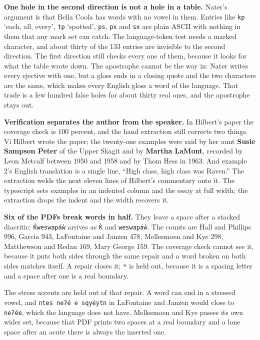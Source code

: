 \textbf{One hole in the second direction is not a hole in a table.} Nater's argument is that Bella Coola has words with no vowel in them. Entries like \texttt{kp} `each, all, every', \texttt{tp} `spotted', \texttt{ps}, \texttt{px} and \texttt{sx} are plain ASCII with nothing in them that any mark set can catch. The language-token test needs a marked character, and about thirty of the 133 entries are invisible to the second direction. The first direction still checks every one of them, because it looks for what the table wrote down. The apostrophe cannot be the way in: Nater writes every ejective with one, but a gloss ends in a closing quote and the two characters are the same, which makes every English gloss a word of the language. That trade is a few hundred false holes for about thirty real ones, and the apostrophe stays out.

\textbf{Verification separates the author from the speaker.} In Hilbert's paper \cite{src:Hilbert-1983} the coverage check is 100 percent, and the hand extraction still corrects two things. Vi Hilbert wrote the paper; the twenty-one examples were said by her aunt \textbf{Susie Sampson Peter} of the Upper Skagit and by \textbf{Martha LaMont}, recorded by Leon Metcalf between 1950 and 1958 and by Thom Hess in 1963. And example 2's English translation is a single line, ``High class, high class was Raven.'' The extraction welds the next eleven lines of Hilbert's commentary onto it. The typescript sets examples in an indented column and the essay at full width; the extraction drops the indent and the width recovers it.

\textbf{Six of the PDFs break words in half.} They leave a space after a stacked diacritic: \texttt{K̓weswapáw̓} arrives as \texttt{K̓} and \texttt{weswapáw̓}. The counts are Hall and Phillips 996, Garcia 943, LaFontaine and Janzen 478, Mellesmoen and Kye 298, Matthewson and Redan 169, Mary George 159. The coverage check cannot see it, because it puts both sides through the same repair and a word broken on both sides matches itself. A repair closes it; \texttt{ʷ} is held out, because it is a spacing letter and a space after one is a real boundary.

The stress accents are held out of that repair. A word can end in a stressed vowel, and \texttt{ntes neʔé e sqyéytn} in LaFontaine and Janzen would close to \texttt{neʔée}, which the language does not have. Mellesmoen and Kye passes its own wider set, because that PDF prints two spaces at a real boundary and a lone space after an acute there is always the inserted one.

